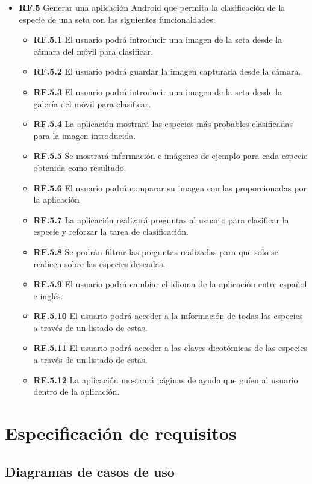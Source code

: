 \begin{itemize}
	\item \textbf{RF.5} Generar una aplicación Android que permita la clasificación de la especie de una seta con las siguientes funcionaldades:
	\begin{itemize}
	\item \textbf{RF.5.1} El usuario podrá introducir una imagen de la seta desde la cámara del móvil para clasificar.
	\item \textbf{RF.5.2} El usuario podrá guardar la imagen capturada desde la cámara.
	\item \textbf{RF.5.3} El usuario podrá introducir una imagen de la seta desde la galería del móvil para clasificar.
	\item \textbf{RF.5.4} La aplicación mostrará las especies más probables clasificadas para la imagen introducida.
	\item \textbf{RF.5.5} Se mostrará información e imágenes de ejemplo para cada especie obtenida como resultado.
	\item \textbf{RF.5.6} El usuario podrá comparar su imagen con las proporcionadas por la aplicación 
	\item \textbf{RF.5.7} La aplicación realizará preguntas al usuario para clasificar la especie y reforzar la tarea de clasificación.
	\item \textbf{RF.5.8} Se podrán filtrar las preguntas realizadas para que solo se realicen sobre las especies deseadas.
	\item \textbf{RF.5.9} El usuario podrá cambiar el idioma de la aplicación entre español e inglés.
	\item \textbf{RF.5.10} El usuario podrá acceder a la información de todas las especies a través de un listado de estas.
	\item \textbf{RF.5.11} El usuario podrá acceder a las claves dicotómicas de las especies a través de un listado de estas.
	\item \textbf{RF.5.12} La aplicación mostrará páginas de ayuda que guíen al usuario dentro de la aplicación.
	
	\end{itemize}
	
\end{itemize}


\section{Especificación de requisitos}

\subsection{Diagramas de casos de uso}

